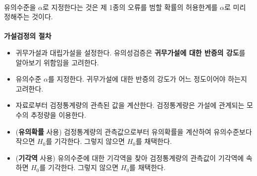 \\
유의수준을 $\alpha$로 지정한다는 것은 제 1종의 오류를 범할 확률의 허용한계를 $\alpha$로 미리 정해주는 것이다.\\

\\
\textbf{가설검정의 절차}
\begin{itemize}
	\item 귀무가설과 대립가설을 설정한다. 유의성검증은 \textbf{귀무가설에 대한 반증의 강도}를 알아보기 위함임을 고려한다.
	\item 유의수준 $\alpha$를 지정한다. 귀무가설에 대한 반증의 강도가 어느 정도이어야 하는지 고려한다.
	\item 자료로부터 검정통계량의 관측된 값을 계산한다. 검정통계량은 가설에 관계되는 모수의 추정량을 이용한다.
	\item (\textbf{유의확률} 사용) 검정통계량의 관측값으로부터 유의확률을 계산하여 유의수준보다 작으면 $H_0$를 기각한다. 그렇지 않으면 $H_0$를 채택한다.
	\item (\textbf{기각역} 사용) 유의수준에 대한 기각역을 찾아 검정통계량의 관측값이 기각역에 속하면 $H_0$를 기각한다. 그렇지 않으면 $H_0$를 채택한다.
\end{itemize}~

